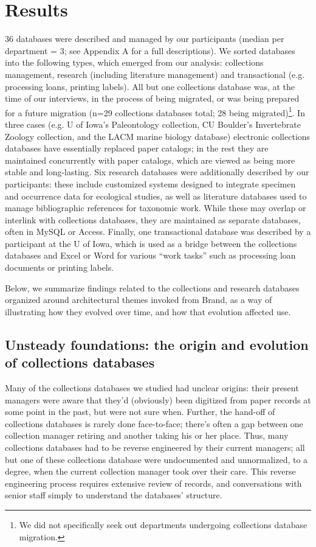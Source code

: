 \section{Results}

36 databases were described and managed by our participants (median per department = 3; see Appendix A for a full descriptions). We sorted databases into the following types, which emerged from our analysis: collections management, research (including literature management) and transactional (e.g. processing loans, printing labels). All but one collections database was, at the time of our interviews, in the process of being migrated, or was being prepared for a future migration (n=29 collections databases total; 28 being migrated)\footnote{We did not specifically seek out departments undergoing collections database migration.}. In three cases (e.g. U of Iowa’s Paleontology collection, CU Boulder’s Invertebrate Zoology collection, and the LACM marine biology database) electronic collections databases have essentially replaced paper catalogs; in the rest they are maintained concurrently with paper catalogs, which are viewed as being more stable and long-lasting. Six research databases were additionally described by our participants: these include customized systems designed to integrate specimen and occurrence data for ecological studies, as well as literature databases used to manage bibliographic references for taxonomic work. While these may overlap or interlink with collections databases, they are maintained as separate databases, often in MySQL or Access. Finally, one transactional database was described by a participant at the U of Iowa, which is used as a bridge between the collections databases and Excel or Word for various “work tasks” such as processing loan documents or printing labels. 

Below, we summarize findings related to the collections and research databases organized around architectural themes invoked from Brand, as a way of illustrating how they evolved over time, and how that evolution affected use.

\subsection{Unsteady foundations: the origin and evolution of collections databases}

Many of the collections databases we studied had unclear origins: their present managers were aware that they'd (obviously) been digitized from paper records at some point in the past, but were not sure when. Further, the hand-off of collections databases is rarely done face-to-face; there's often a gap between one collection manager retiring and another taking his or her place. Thus, many collections databases had to be reverse engineered by their current managers; all but one of these collections database were undocumented and unnormalized, to a degree, when the current collection manager took over their care. This reverse engineering process requires extensive review of records, and conversations with senior staff simply to understand the databases’ structure. 

